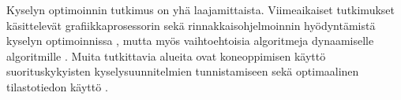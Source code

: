\documentclass[finnish]{tktltiki2}
\theoremstyle{definition}
\theoremstyle{remark}
\begin{document}
Kyselyn optimoinnin tutkimus on yhä laajamittaista. Viimeaikaiset tutkimukset käsittelevät grafiikkaprosessorin sekä rinnakkaisohjelmoinnin hyödyntämistä kyselyn optimoinnissa \cite{heimel2012first, Wu:2011:QOM:2038916.2038928}, mutta myös vaihtoehtoisia algoritmeja dynaamiselle algoritmille \cite{sevincc2011evolutionary}. Muita tutkittavia alueita ovat koneoppimisen käyttö suorituskykyisten kyselysuunnitelmien tunnistamiseen \cite{borkar2012declarative} sekä optimaalinen tilastotiedon käyttö \cite{haas2009discovering}.

\newpage

%


\end{document}
